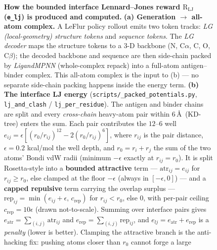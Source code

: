 \documentclass[11pt]{article}
\newcommand{\R}{\mathrm{R}}
\newcommand{\ttk}[1]{\texttt{\small #1}}
\begin{document}
\begin{figure}[htbp]
{%
}
\caption{\textbf{How the bounded interface Lennard--Jones reward $\R_{\mathrm{LJ}}$ (\ttk{e\_lj}) is
produced and computed.}
\textbf{(a) Generation $\rightarrow$ all-atom complex.} A LeFlur policy rollout emits two token
tracks: \emph{LG (local-geometry) structure tokens} and \emph{sequence tokens}. The \emph{LG
decoder} maps the structure tokens to a $3$-D backbone (N, C$\alpha$, C, O, C$\beta$); the decoded
backbone and sequence are then side-chain packed by \emph{LigandMPNN} (whole-complex repack) into a
full-atom antigen--binder complex. This all-atom complex is the input to (b) --- no separate
side-chain packing happens inside the energy term.
\textbf{(b) The interface LJ energy} (\ttk{scripts/\_packed\_potentials.py}, \ttk{lj\_and\_clash} /
\ttk{lj\_per\_residue}). The antigen and binder chains are split and every \emph{cross-chain}
heavy-atom pair within $6$\,\AA\ (KD-tree) enters the sum. Each pair contributes the $12$--$6$ well
$e_{ij}=\epsilon[(r_0/r_{ij})^{12}-2(r_0/r_{ij})^{6}]$, where $r_{ij}$ is the pair distance,
$\epsilon{=}0.2$ kcal/mol the well depth, and $r_0=r_i+r_j$ the sum of the two atoms' Bondi vdW
radii (minimum $-\epsilon$ exactly at $r_{ij}{=}r_0$). It is split Rosetta-style into a
\textcolor{aLine}{\textbf{bounded attractive}} term --- $\mathrm{atr}_{ij}=e_{ij}$ for
$r_{ij}\ge r_0$, else clamped at the floor $-\epsilon$ (always in $[-\epsilon,0]$) --- and a
\textcolor{bLine}{\textbf{capped repulsive}} term carrying the overlap surplus ---
$\mathrm{rep}_{ij}=\min(e_{ij}{+}\epsilon,\,c_{\mathrm{rep}})$ for $r_{ij}<r_0$, else $0$, with
per-pair ceiling $c_{\mathrm{rep}}{=}10\epsilon$ (drawn not-to-scale). Summing over interface pairs
gives $e_{\mathrm{atr}}=\sum_{(i,j)}\mathrm{atr}_{ij}$ and $e_{\mathrm{rep}}=\sum_{(i,j)}\mathrm{rep}_{ij}$,
and $e_{lj}=e_{\mathrm{atr}}+e_{\mathrm{rep}}$ is a \emph{penalty} (lower is better). Clamping the
attractive branch is the anti-hacking fix: pushing atoms closer than $r_0$ cannot forge a large
}
\end{figure}
\end{document}
